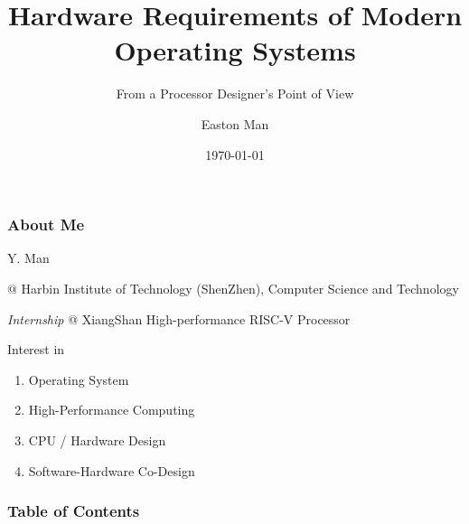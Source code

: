 \documentclass[aspectratio=169]{beamer}
\title{Hardware Requirements of Modern Operating Systems}
\subtitle{From a Processor Designer's Point of View}
\author{Easton Man}
\institute[HITSZ]{Harbin Institute of Technology (ShenZhen)}
\date{\today}
\begin{document}
\frame{\titlepage}

\begin{frame}
    \frametitle{About Me}

    Y. Man

    @ Harbin Institute of Technology (ShenZhen), Computer Science and Technology

    \emph{Internship} @ XiangShan High-performance RISC-V Processor

    \vspace{2em}

    Interest in
    \begin{enumerate}
        \item Operating System
        \item High-Performance Computing
        \item CPU / Hardware Design
        \item Software-Hardware Co-Design
    \end{enumerate}

\end{frame}

\begin{frame}
    \frametitle{Table of Contents}
    \tableofcontents
\end{frame}






\end{document}
